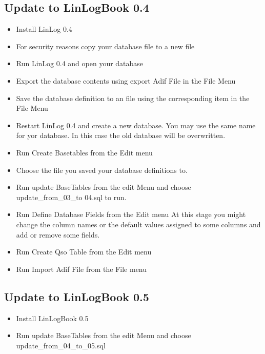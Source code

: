 \documentclass[a4paper,11pt]{article}
\begin{document}
\subsection{Update to LinLogBook 0.4}
\begin{itemize}
  \item Install LinLog 0.4
  \item For security reasons copy your database file to a new file
  \item Run LinLog 0.4 and open your database
  \item Export the database contents using export Adif File in the File Menu
  \item Save the database definition to an file using the corresponding item in the
File Menu
  \item Restart LinLog 0.4 and create a new database. You may use the same
name for yor database. In this case the old database will be overwritten.
  \item Run Create Basetables from the Edit menu
  \item Choose the file you saved your database definitions to.
  \item Run update BaseTables from the edit Menu and choose\\
  update\_from\_03\_to 04.sql
to run.
  \item Run Define Database Fields from the Edit menu
At this stage you might change the column names or the default values
assigned to some columns and add or remove some fields.
  \item Run Create Qso Table from the Edit menu
  \item Run Import Adif File from the File menu

\end{itemize}
\subsection{Update to LinLogBook 0.5}
\begin{itemize}
  \item Install LinLogBook 0.5
  \item Run update BaseTables from the edit Menu and choose\\
  update\_from\_04\_to\_05.sql
\end{itemize}
\end{document}
